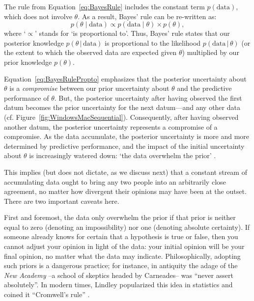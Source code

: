 \documentclass[man]{apa7}
\newcommand{\given}{\, | \,}
\begin{document}
The rule from Equation~\ref{eq:BayesRule} includes the constant term $p(\text{data})$, which does not involve $\theta$. As a result, Bayes' rule can be re-written as:
\begin{equation}
\label{eq:BayesRulePropto}
p(\theta \mid \text{data}) \propto p(\text{data} \mid \theta) \times p(\theta),
\end{equation}
where `$\propto$' stands for `is proportional to'. Thus, Bayes' rule states that our posterior knowledge $p(\theta \given \text{data})$ is proportional to the likelihood $p(\text{data} \given \theta)$ (or the extent to which the observed data are expected given $\theta$) multiplied by our prior knowledge $p(\theta)$.

Equation~\ref{eq:BayesRulePropto} emphasizes that the posterior uncertainty about $\theta$ is a \emph{compromise} between our prior uncertainty about $\theta$ and the predictive performance of $\theta$. But, the posterior uncertainty after having observed the first datum becomes the prior uncertainty for the next datum---and any other data (cf. Figure~\ref{fig:WindowsMacSequential}). Consequently, after having observed another datum, the posterior uncertainty represents a compromise of a compromise. As the data accumulate, the posterior uncertainty is more and more determined by predictive performance, and the impact of the initial uncertainty about $\theta$ is increasingly watered down: `the data overwhelm the prior' \parencite{WrinchJeffreys1919}.

This implies (but does not dictate, as we discuss next) that a constant stream of accumulating data ought to bring any two people into an arbitrarily close agreement, no matter how divergent their opinions may have been at the outset. There are two important caveats here. 

First and foremost, the data only overwhelm the prior if that prior is neither equal to zero (denoting an impossibility) nor one (denoting absolute certainty). If someone already knows for certain that a hypothesis is true or false, then you cannot adjust your opinion in light of the data: your initial opinion will be your final opinion, no matter what the data may indicate. Philosophically, adopting such priors is a dangerous practice; for instance, in antiquity the adage of the \emph{New Academy} --a school of skeptics headed by Carneades-- was ``never assert absolutely''. In modern times, Lindley popularized this idea in statistics and coined it ``Cromwell's rule'' \parencite[p. 104]{Lindley1985}.
\end{document}
